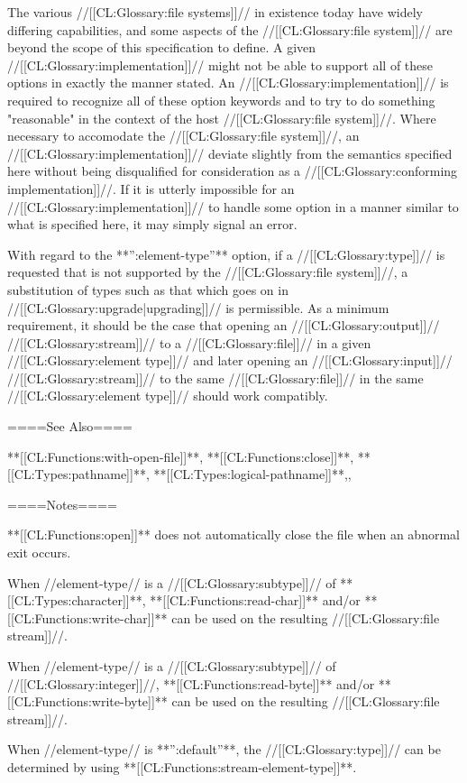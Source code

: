 The various //[[CL:Glossary:file systems]]// in existence today have widely differing capabilities, and some aspects of the //[[CL:Glossary:file system]]// are beyond the scope of this specification to define. A given //[[CL:Glossary:implementation]]// might not be able to support all of these options in exactly the manner stated. An //[[CL:Glossary:implementation]]// is required to recognize all of these option keywords and to try to do something "reasonable" in the context of the host //[[CL:Glossary:file system]]//. Where necessary to accomodate the //[[CL:Glossary:file system]]//, an //[[CL:Glossary:implementation]]// deviate slightly from the semantics specified here without being disqualified for consideration as a //[[CL:Glossary:conforming implementation]]//. If it is utterly impossible for an //[[CL:Glossary:implementation]]// to handle some option in a manner similar to what is specified here, it may simply signal an error.

With regard to the **'':element-type''** option, if a //[[CL:Glossary:type]]// is requested that is not supported by the //[[CL:Glossary:file system]]//, a substitution of types such as that which goes on in //[[CL:Glossary:upgrade|upgrading]]// is permissible. As a minimum requirement, it should be the case that opening an //[[CL:Glossary:output]]// //[[CL:Glossary:stream]]// to a //[[CL:Glossary:file]]// in a given //[[CL:Glossary:element type]]// and later opening an //[[CL:Glossary:input]]// //[[CL:Glossary:stream]]// to the same //[[CL:Glossary:file]]// in the same //[[CL:Glossary:element type]]// should work compatibly.

====See Also====

**[[CL:Functions:with-open-file]]**, **[[CL:Functions:close]]**, **[[CL:Types:pathname]]**, **[[CL:Types:logical-pathname]]**,{\secref\MergingPathnames},

{\secref\PathnamesAsFilenames}

====Notes====



**[[CL:Functions:open]]** does not automatically close the file when an abnormal exit occurs.

When //element-type// is a //[[CL:Glossary:subtype]]// of **[[CL:Types:character]]**, **[[CL:Functions:read-char]]** and/or **[[CL:Functions:write-char]]** can be used on the resulting //[[CL:Glossary:file stream]]//.

When //element-type// is a //[[CL:Glossary:subtype]]// of //[[CL:Glossary:integer]]//, **[[CL:Functions:read-byte]]** and/or **[[CL:Functions:write-byte]]** can be used on the resulting //[[CL:Glossary:file stream]]//.

When //element-type// is **'':default''**, the //[[CL:Glossary:type]]// can be determined by using **[[CL:Functions:stream-element-type]]**.

       
